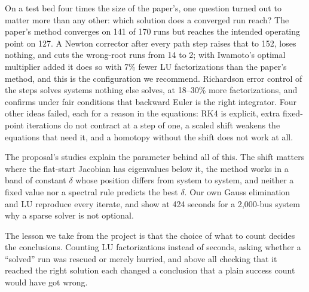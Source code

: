 \documentclass[11pt,a4paper]{article}
\begin{document}
On a test bed four times the size of the paper's, one question turned out to matter more than any other:
which solution does a converged run reach? The paper's method converges on 141 of 170 runs but reaches the
intended operating point on 127. A Newton corrector after every path step raises that to 152, loses nothing,
and cuts the wrong-root runs from 14 to 2; with Iwamoto's optimal multiplier added it does so with 7\% fewer
LU factorizations than the paper's method, and this is the configuration we recommend. Richardson error
control of the steps solves systems nothing else solves, at 18--30\% more factorizations, and confirms under
fair conditions that backward Euler is the right integrator. Four other ideas failed, each for a reason in
the equations: RK4 is explicit, extra fixed-point iterations do not contract at a step of one, a scaled shift
weakens the equations that need it, and a homotopy without the shift does not work at all.

The proposal's studies explain the parameter behind all of this. The shift matters where the flat-start
Jacobian has eigenvalues below it, the method works in a band of constant $\delta$ whose position differs from
system to system, and neither a fixed value nor a spectral rule predicts the best $\delta$. Our own Gauss
elimination and LU reproduce every iterate, and show at 424 seconds for a 2{,}000-bus system why a sparse
solver is not optional.

The lesson we take from the project is that the choice of what to count decides the conclusions. Counting LU
factorizations instead of seconds, asking whether a ``solved'' run was rescued or merely hurried, and above
all checking that it reached the right solution each changed a conclusion that a plain success count would
have got wrong.
\end{document}
